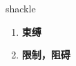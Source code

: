 
\begin{frame}
{\huge shackle}
\begin{center}
\begin{enumerate}\Large
  \item \textbf{束缚}
  \item \textbf{限制，阻碍}
\end{enumerate}
\end{center}
\end{frame}
